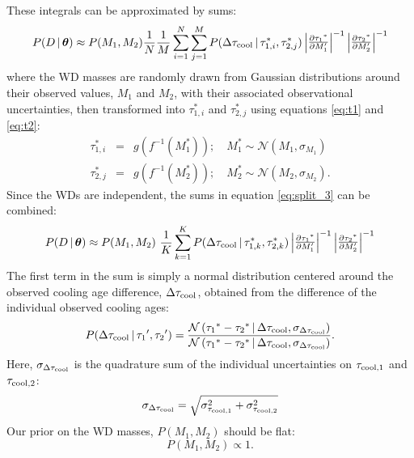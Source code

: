 \documentclass[12pt,preprint]{hackaastex}
\begin{document}
These integrals can be approximated by sums:
\begin{equation}
P(D \given \bs{\theta}) \approx P(M_1, M_2) \frac{1}{N} \frac{1}{M} \sum_{i=1}^N \sum_{j=1}^M  P(\Delta \tauc \given \tau_{1,i}^*, \tau_{2,j}^*) \begin{vmatrix} \frac{\partial \ta^*}{\partial M_1'} \end{vmatrix}^{-1}  \begin{vmatrix} \frac{\partial \tb^*}{\partial M_2'} \end{vmatrix}^{-1}  \label{eq:split_3}
\end{equation}
where the WD masses are randomly drawn from Gaussian distributions around their observed values, $M_1$ and $M_2$, with their associated observational uncertainties, then transformed into $\tau_{1,i}^*$ and $\tau_{2,j}^*$ using equations \ref{eq:t1} and \ref{eq:t2}:
\begin{eqnarray}
\tau_{1,i}^* &=& g\left( f^{-1}(M_1^*) \right); \quad M_1^* \sim \mathcal{N}(M_1, \sigma_{M_1}) \\
\tau_{2,j}^* &=& g\left( f^{-1}(M_2^*) \right); \quad M_2^* \sim \mathcal{N}(M_2, \sigma_{M_2}).
\end{eqnarray}
Since the WDs are independent, the sums in equation \ref{eq:split_3} can be combined:
\begin{equation}
P(D \given \bs{\theta}) \approx P(M_1, M_2) ~\frac{1}{K} \sum_{k=1}^{K} P(\Delta \tauc \given \tau_{1,k}^*, \tau_{2,k}^*) \begin{vmatrix} \frac{\partial \ta^*}{\partial M_1'} \end{vmatrix}^{-1}  \begin{vmatrix} \frac{\partial \tb^*}{\partial M_2'} \end{vmatrix}^{-1}  \label{eq:split_4}
\end{equation}
The first term in the sum is simply a normal distribution centered around the observed cooling age difference, $\Delta \tau_{\rm cool}$, obtained from the difference of the individual observed cooling ages:
\begin{equation}
P(\Delta \tau_{\rm cool} \given \ta', \tb') = \frac{\mathcal{N} \left( \ta^* -\tb^* \given \Delta \tau_{\rm cool}, \sigma_{\Delta \tau_{\rm cool}} \right)}{\mathcal{N} \left( \ta^* -\tb^* \given \Delta \tau_{\rm cool}, \sigma_{\Delta \tau_{\rm cool}} \right)}. \label{eq:gauss_t_cool}
\end{equation} 
Here, $\sigma_{\Delta \tau_{\rm cool}}$ is the quadrature sum of the individual uncertainties on $\tau_{\rm cool,1}$ and $\tau_{\rm cool,2}$:
\begin{equation}
\sigma_{\Delta \tau_{\rm cool}} = \sqrt{\sigma_{\tau_{\rm cool,1}}^2 + \sigma_{\tau_{\rm cool,2}}^2}
\end{equation}
Our prior on the WD masses, $P(M_1, M_2)$ should be flat:
\begin{equation}
P(M_1, M_2) \propto 1.
\end{equation}
\end{document}
